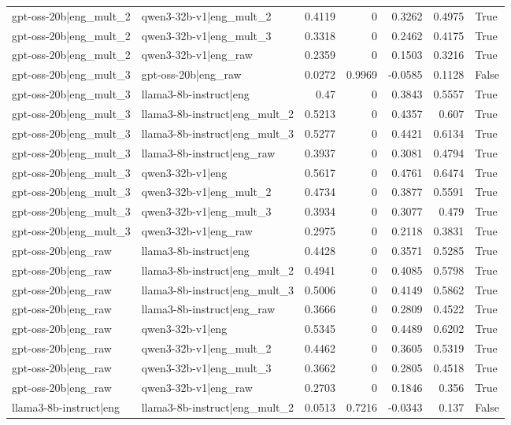\begin{table}
\begin{tabular}{l l r r r r l}
gpt-oss-20b|eng_mult_2 & qwen3-32b-v1|eng_mult_2 & 0.4119 & 0 & 0.3262 & 0.4975 & True \\
gpt-oss-20b|eng_mult_2 & qwen3-32b-v1|eng_mult_3 & 0.3318 & 0 & 0.2462 & 0.4175 & True \\
gpt-oss-20b|eng_mult_2 & qwen3-32b-v1|eng_raw & 0.2359 & 0 & 0.1503 & 0.3216 & True \\
gpt-oss-20b|eng_mult_3 & gpt-oss-20b|eng_raw & 0.0272 & 0.9969 & -0.0585 & 0.1128 & False \\
gpt-oss-20b|eng_mult_3 & llama3-8b-instruct|eng & 0.47 & 0 & 0.3843 & 0.5557 & True \\
gpt-oss-20b|eng_mult_3 & llama3-8b-instruct|eng_mult_2 & 0.5213 & 0 & 0.4357 & 0.607 & True \\
gpt-oss-20b|eng_mult_3 & llama3-8b-instruct|eng_mult_3 & 0.5277 & 0 & 0.4421 & 0.6134 & True \\
gpt-oss-20b|eng_mult_3 & llama3-8b-instruct|eng_raw & 0.3937 & 0 & 0.3081 & 0.4794 & True \\
gpt-oss-20b|eng_mult_3 & qwen3-32b-v1|eng & 0.5617 & 0 & 0.4761 & 0.6474 & True \\
gpt-oss-20b|eng_mult_3 & qwen3-32b-v1|eng_mult_2 & 0.4734 & 0 & 0.3877 & 0.5591 & True \\
gpt-oss-20b|eng_mult_3 & qwen3-32b-v1|eng_mult_3 & 0.3934 & 0 & 0.3077 & 0.479 & True \\
gpt-oss-20b|eng_mult_3 & qwen3-32b-v1|eng_raw & 0.2975 & 0 & 0.2118 & 0.3831 & True \\
gpt-oss-20b|eng_raw & llama3-8b-instruct|eng & 0.4428 & 0 & 0.3571 & 0.5285 & True \\
gpt-oss-20b|eng_raw & llama3-8b-instruct|eng_mult_2 & 0.4941 & 0 & 0.4085 & 0.5798 & True \\
gpt-oss-20b|eng_raw & llama3-8b-instruct|eng_mult_3 & 0.5006 & 0 & 0.4149 & 0.5862 & True \\
gpt-oss-20b|eng_raw & llama3-8b-instruct|eng_raw & 0.3666 & 0 & 0.2809 & 0.4522 & True \\
gpt-oss-20b|eng_raw & qwen3-32b-v1|eng & 0.5345 & 0 & 0.4489 & 0.6202 & True \\
gpt-oss-20b|eng_raw & qwen3-32b-v1|eng_mult_2 & 0.4462 & 0 & 0.3605 & 0.5319 & True \\
gpt-oss-20b|eng_raw & qwen3-32b-v1|eng_mult_3 & 0.3662 & 0 & 0.2805 & 0.4518 & True \\
gpt-oss-20b|eng_raw & qwen3-32b-v1|eng_raw & 0.2703 & 0 & 0.1846 & 0.356 & True \\
llama3-8b-instruct|eng & llama3-8b-instruct|eng_mult_2 & 0.0513 & 0.7216 & -0.0343 & 0.137 & False \\

\end{tabular}
\end{table}

